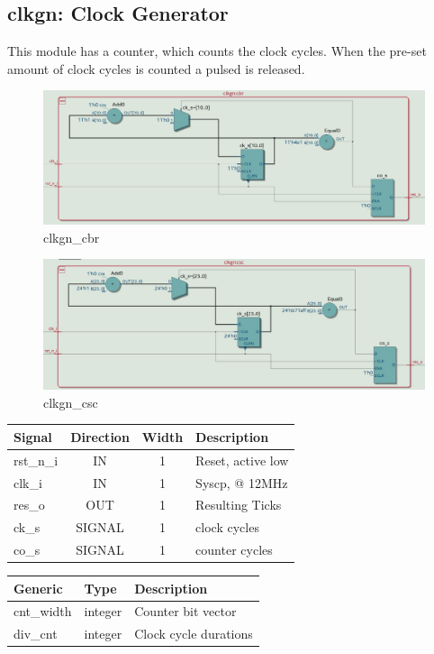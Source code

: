 \documentclass[12pt,a4 paper] {report}
\begin{document}
\subsection{clkgn: Clock Generator}
This module has a counter, which counts the clock cycles. When the pre-set amount of clock cycles is counted a pulsed 
is released.
\begin{figure}[h]
	\centering	
	\includegraphics[scale=0.2]{../png/clkgn_cbr.png}
	\caption{clkgn\_cbr}
\end{figure}
\begin{figure}[h]
	\centering	
	\includegraphics[scale=0.2]{../png/clkgn_csc.png}
	\caption{clkgn\_csc}
\end{figure}
\begin{center}
	\begin{tabular}{ | p{2cm} | c | c | p{5cm} |}
		\hline
		\textbf{Signal} & \textbf{Direction} & \textbf{Width} & \textbf{Description} \\
		\hline	
  	rst\_n\_i & IN & 1 & Reset, active low \\
  	\hline
		clk\_i & IN & 1 & Syscp, @ 12MHz \\
		\hline
		res\_o & OUT & 1 & Resulting Ticks \\
		\hline
		\hline
		ck\_s & SIGNAL & 1 & clock cycles\\
		\hline
		co\_s & SIGNAL & 1 & counter cycles \\
		\hline
		
	\end{tabular}
\end{center}
\begin{center}
	\begin{tabular}{| p{2cm} | p{2cm} | p{4cm} |}
	\hline
	\textbf{Generic} & \textbf{Type} & \textbf{Description} \\
	\hline
	cnt\_width & integer & Counter bit vector \\
	\hline
	div\_cnt & integer & Clock cycle durations \\	
	\hline
	\end{tabular}
\end{center}
\end{document}

